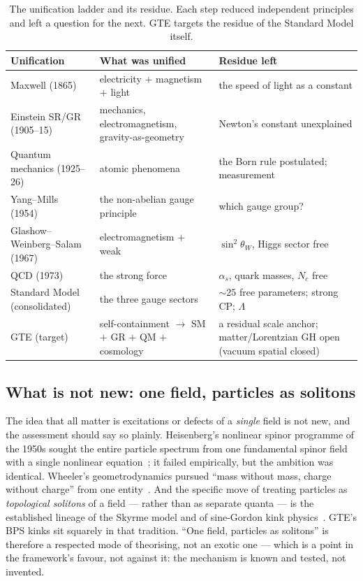 \documentclass[11pt]{article}
\newcommand{\sigW}{\ensuremath{\sin^2\!\theta_W}}
\begin{document}
\begin{table}[htbp]
\centering
\caption{The unification ladder and its residue.  Each step reduced independent
principles and left a question for the next.  GTE targets the residue of the
Standard Model itself.}
\label{tab:residue}
\small\renewcommand{\arraystretch}{1.2}
\begin{tabularx}{\textwidth}{@{}P{4.0cm}P{4.4cm}Y@{}}
\toprule
\textbf{Unification} & \textbf{What was unified} & \textbf{Residue left} \\
\midrule
Maxwell (1865) & electricity $+$ magnetism $+$ light & the speed of light as a constant \\
Einstein SR/GR (1905--15) & mechanics, electromagnetism, gravity-as-geometry & Newton's constant unexplained \\
Quantum mechanics (1925--26) & atomic phenomena & the Born rule postulated; measurement \\
Yang--Mills (1954)~\cite{YangMills1954} & the non-abelian gauge principle & which gauge group? \\
Glashow--Weinberg--Salam (1967)~\cite{Glashow1961,Weinberg1967,Salam1968} & electromagnetism $+$ weak & $\sigW$, Higgs sector free \\
QCD (1973)~\cite{GrossWilczek1973,Politzer1973} & the strong force & $\alpha_s$, quark masses, $N_c$ free \\
Standard Model (consolidated) & the three gauge sectors & $\sim 25$ free parameters; strong CP; $\Lambda$ \\
GTE (target) & self-containment $\to$ SM $+$ GR $+$ QM $+$ cosmology & a residual scale anchor; matter/Lorentzian GH open (vacuum spatial closed) \\
\bottomrule
\end{tabularx}
\end{table}

\subsection{What is not new: one field, particles as solitons}

The idea that all matter is excitations or defects of a \emph{single} field is not
new, and the assessment should say so plainly.  Heisenberg's nonlinear spinor
programme of the 1950s sought the entire particle spectrum from one fundamental
spinor field with a single nonlinear equation~\cite{Heisenberg1957}; it failed
empirically, but the ambition was identical.  Wheeler's geometrodynamics pursued
``mass without mass, charge without charge'' from one entity~\cite{wheeler1989}.
And the specific move of treating particles as \emph{topological solitons} of a
field --- rather than as separate quanta --- is the established lineage of the
Skyrme model and of sine-Gordon kink physics~\cite{Skyrme1962}.  GTE's BPS kinks
sit squarely in that tradition.  ``One field, particles as solitons'' is therefore
a respected mode of theorising, not an exotic one --- which is a point in the
framework's favour, not against it: the mechanism is known and tested, not
invented.
\end{document}
